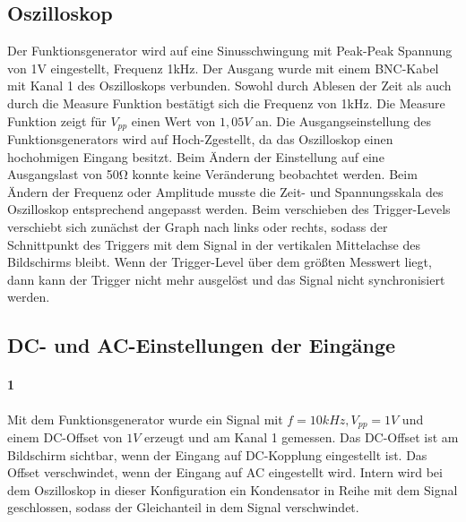 \documentclass[a4paper]{article}
\begin{document}
    \subsection{Oszilloskop}
    
    Der Funktionsgenerator wird auf eine Sinusschwingung mit Peak-Peak Spannung von 1V eingestellt, Frequenz 1kHz. Der Ausgang wurde mit einem BNC-Kabel mit Kanal 1 des Oszilloskops verbunden. Sowohl durch Ablesen der Zeit als auch durch die Measure Funktion bestätigt sich die Frequenz von 1kHz. Die Measure Funktion zeigt für $V_{pp}$ einen Wert von $1,05 \si{V}$ an.
    Die Ausgangseinstellung des Funktionsgenerators wird auf \glqq Hoch-Z\grqq gestellt, da das Oszilloskop einen hochohmigen Eingang besitzt. Beim Ändern der Einstellung auf eine Ausgangslast von 50\si{\ohm} konnte keine Veränderung beobachtet werden.
    Beim Ändern der Frequenz oder Amplitude musste die Zeit- und Spannungsskala des Oszilloskop entsprechend angepasst werden.
    Beim verschieben des Trigger-Levels verschiebt sich zunächst der Graph nach links oder rechts, sodass der Schnittpunkt des Triggers mit dem Signal in der vertikalen Mittelachse des Bildschirms bleibt. Wenn der Trigger-Level über dem größten Messwert liegt, dann kann der Trigger nicht mehr ausgelöst und das Signal nicht synchronisiert werden.
    
    \subsection{DC- und AC-Einstellungen der Eingänge}
    \paragraph{1}
    Mit dem Funktionsgenerator wurde ein Signal mit $f=10\si{kHz}, V_{pp}=1\si{V}$ und einem DC-Offset von $1\si{V}$ erzeugt und am Kanal 1 gemessen. Das DC-Offset ist am Bildschirm sichtbar, wenn der Eingang auf DC-Kopplung eingestellt ist. Das Offset verschwindet, wenn der Eingang auf AC eingestellt wird. Intern wird bei dem Oszilloskop in dieser Konfiguration ein Kondensator in Reihe mit dem Signal geschlossen, sodass der Gleichanteil in dem Signal verschwindet.
    
\end{document}
